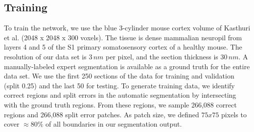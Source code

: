 

%  


\subsection{Training}
To train the network, we use the blue 3-cylinder mouse cortex volume of Kasthuri et al. \cite{kasthuri2015saturated} (2048 x 2048 x 300 voxels). The tissue is dense mammalian neuropil from layers 4 and 5 of the S1 primary somatosensory cortex of a healthy mouse. The resolution of our data set is $3\, nm$ per pixel, and the section thickness is $30\, nm$. 
A manually-labeled expert segmentation is available as a ground truth for the entire data set. We use the first 250 sections of the data for training and validation (split 0.25) and the last 50 for testing. To generate training data, we identify correct regions and split errors in the automatic segmentation by intersecting with the ground truth regions. From these regions, we sample 266,088 correct regions and 266,088 split error patches. As patch size, we defined $75 x 75$ pixels to cover $\approx80\%$ of all boundaries in our segmentation output. 
%


